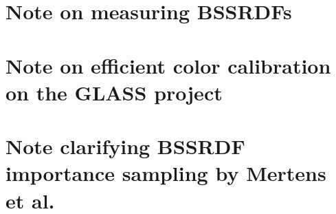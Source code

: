 \chapter{Note on measuring BSSRDFs}
\label{sec:bssrdfnote}

%
\chapter{Note on efficient color calibration on the GLASS project}
\label{sec:colornote}

%
\chapter{Note clarifying BSSRDF importance sampling by Mertens et al.}
\label{sec:mertensnote}


